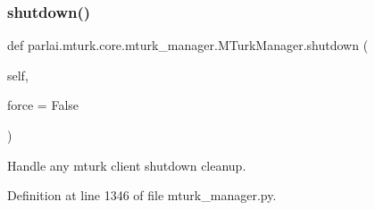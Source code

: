 \subsubsection{\texorpdfstring{shutdown()}{shutdown()}}
{\footnotesize\ttfamily def parlai.\+mturk.\+core.\+mturk\+\_\+manager.\+M\+Turk\+Manager.\+shutdown (\begin{DoxyParamCaption}\item[{}]{self,  }\item[{}]{force = {\ttfamily False} }\end{DoxyParamCaption})}

\begin{DoxyVerb}Handle any mturk client shutdown cleanup.
\end{DoxyVerb}
 

Definition at line 1346 of file mturk\+\_\+manager.\+py.


